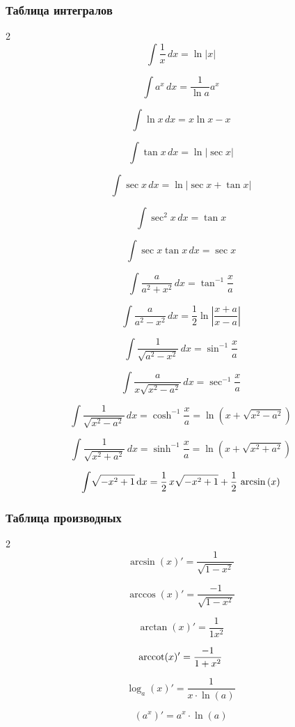 \subsubsection{Таблица интегралов}
\newcommand{\dx}{\hspace{2pt}dx}
\newcommand{\dd}[1]{\hspace{2pt}d#1}


\begin{minipage}{0.48\textwidth}
	\begin{multicols}{2}
		$$\int \frac{1}{x}\dx = \ln |x|$$
		
		$$\int a^x \dx = \frac{1}{\ln a} a^x$$

		$$\int \ln x \dx = x \ln x - x$$

		$$\int \tan x \dx = \ln |\sec x|$$

		$$\int \sec x \dx = \ln |\sec x + \tan x|$$
		
		$$\int \sec^2 x \dx = \tan x$$

		$$\int \sec x \tan x \dx = \sec x$$
		
		$$\int \frac{a}{a^2+x^2}\dx = \tan^{-1}\frac{x}{a}$$

		$$\int \frac{a}{a^2-x^2}\dx = \frac{1}{2}\ln\left|\frac{x+a}{x-a}\right|$$
		
		$$\int \frac{1}{\sqrt{a^2-x^2}} \dx = \sin^{-1} \frac{x}{a}$$

		$$\int \frac{a}{x \sqrt{x^2-a^2}} \dx = \sec^{-1} \frac{x}{a}$$
		
		$$\int \frac{1}{\sqrt{x^2-a^2}} \dx = \cosh^{-1} \frac{x}{a} = \nonumber \ln (x+\sqrt{x^2-a^2}) $$

		$$\int \frac{1}{\sqrt{x^2+a^2}} \dx = \sinh^{-1} \frac{x}{a} =\nonumber \ln (x+\sqrt{x^2+a^2})$$
		
		$$\int \!\sqrt {-{x}^{2}+1}\,{\rm d}x=\frac{1}{2}\,x\sqrt {-{x}^{2}+1}+\frac{1}{2}\,\arcsin \left( x \right) $$
	\end{multicols}
\end{minipage}

\subsubsection{Таблица производных}

\begin{minipage}{0.48\textwidth}
	\begin{multicols}{2}
		$$\arcsin(x)' = \frac{1}{\sqrt{1-x^2}}$$
		
		$$\arccos(x)' = \frac{-1}{\sqrt{1-x^2}}$$

		$$\arctan(x)' = \frac{1}{1x^2}$$
		
		$$\operatorname{arccot}(x)' = \frac{-1}{1+x^2}$$

		$$\log_a(x)' = \frac{1}{x \cdot \ln(a)}$$
		
		$$(a^x)' = a^x \cdot \ln(a)$$
	\end{multicols}
\end{minipage}

